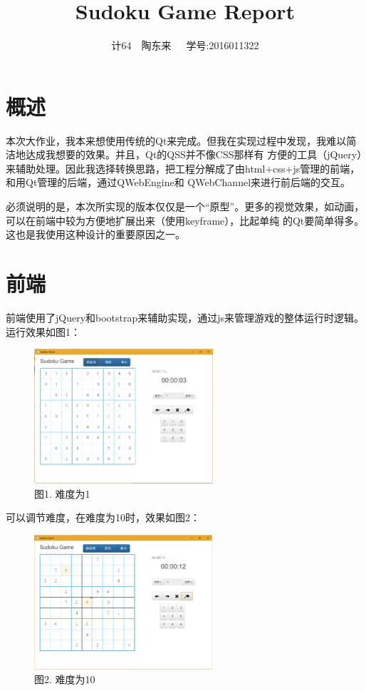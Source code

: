 \documentclass[a4paper,10pt]{article}
\title{Sudoku Game Report}
\author{计64~~陶东来~~~学号:2016011322}
\begin{document}
    \maketitle
    \section{概述}

    本次大作业，我本来想使用传统的Qt来完成。但我在实现过程中发现，我难以简洁地达成我想要的效果。并且，Qt的QSS并不像CSS那样有
    方便的工具（jQuery）来辅助处理。因此我选择转换思路，把工程分解成了由html+css+js管理的前端，和用Qt管理的后端，通过QWebEngine和
    QWebChannel来进行前后端的交互。

    必须说明的是，本次所实现的版本仅仅是一个“原型”。更多的视觉效果，如动画，可以在前端中较为方便地扩展出来（使用keyframe），比起单纯
    的Qt要简单得多。这也是我使用这种设计的重要原因之一。

    \section{前端}

    前端使用了jQuery和bootstrap来辅助实现，通过js来管理游戏的整体运行时逻辑。运行效果如图1：

    \begin{figure}
        \centering
        \includegraphics[height=5cm]{new_game_lvl1.png}
        \caption{图1. 难度为1}
    \end{figure}

    可以调节难度，在难度为10时，效果如图2：

    \begin{figure}
        \centering
        \includegraphics[height=5cm]{playing_lvl10.png}
        \caption{图2. 难度为10}
    \end{figure}
\end{document}
